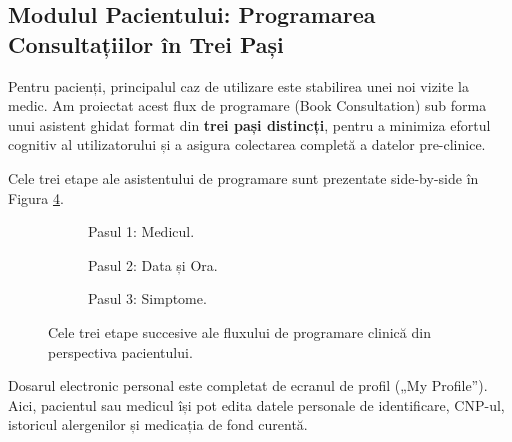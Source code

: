 \subsection{Modulul Pacientului: Programarea Consultațiilor în Trei Pași}
Pentru pacienți, principalul caz de utilizare este stabilirea unei noi vizite la medic. Am proiectat acest flux de programare (Book Consultation) sub forma unui asistent ghidat format din \textbf{trei pași distincți}, pentru a minimiza efortul cognitiv al utilizatorului și a asigura colectarea completă a datelor pre-clinice.

Cele trei etape ale asistentului de programare sunt prezentate side-by-side în Figura \ref{fig:book_consultation_steps}.

\begin{figure}[H]
    \centering
    \begin{subfigure}[b]{0.32\textwidth}
        \centering
        \color{red}
        \caption{Pasul 1: Medicul.}
        \label{fig:book_step1}
    \end{subfigure}
    \hfill
    \begin{subfigure}[b]{0.32\textwidth}
        \centering
        \color{red}
        \caption{Pasul 2: Data și Ora.}
        \label{fig:book_step2}
    \end{subfigure}
    \hfill
    \begin{subfigure}[b]{0.32\textwidth}
        \centering
        \color{red}
        \caption{Pasul 3: Simptome.}
        \label{fig:book_step3}
    \end{subfigure}
    \caption{Cele trei etape succesive ale fluxului de programare clinică din perspectiva pacientului.}
    \label{fig:book_consultation_steps}
\end{figure}

Dosarul electronic personal este completat de ecranul de profil („My Profile”). Aici, pacientul sau medicul își pot edita datele personale de identificare, CNP-ul, istoricul alergenilor și medicația de fond curentă.

